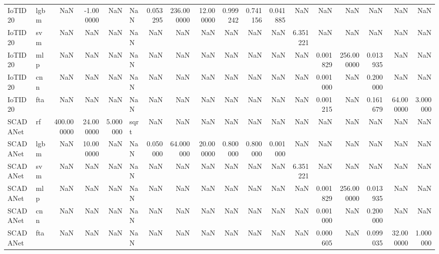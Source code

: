 \begin{tabular}{llrrrlrrrrrrrrrrrr}
IoTID20 & lgbm & NaN & -1.000000 & NaN & NaN & 0.053295 & 236.000000 & 12.000000 & 0.999242 & 0.741156 & 0.041885 & NaN & NaN & NaN & NaN & NaN & NaN \\
IoTID20 & svm & NaN & NaN & NaN & NaN & NaN & NaN & NaN & NaN & NaN & NaN & 6.351221 & NaN & NaN & NaN & NaN & NaN \\
IoTID20 & mlp & NaN & NaN & NaN & NaN & NaN & NaN & NaN & NaN & NaN & NaN & NaN & 0.001829 & 256.000000 & 0.013935 & NaN & NaN \\
IoTID20 & cnn & NaN & NaN & NaN & NaN & NaN & NaN & NaN & NaN & NaN & NaN & NaN & 0.001000 & NaN & 0.200000 & NaN & NaN \\
IoTID20 & fta & NaN & NaN & NaN & NaN & NaN & NaN & NaN & NaN & NaN & NaN & NaN & 0.001215 & NaN & 0.161679 & 64.000000 & 3.000000 \\
SCADANet & rf & 400.000000 & 24.000000 & 5.000000 & sqrt & NaN & NaN & NaN & NaN & NaN & NaN & NaN & NaN & NaN & NaN & NaN & NaN \\
SCADANet & lgbm & NaN & 10.000000 & NaN & NaN & 0.050000 & 64.000000 & 20.000000 & 0.800000 & 0.800000 & 0.001000 & NaN & NaN & NaN & NaN & NaN & NaN \\
SCADANet & svm & NaN & NaN & NaN & NaN & NaN & NaN & NaN & NaN & NaN & NaN & 6.351221 & NaN & NaN & NaN & NaN & NaN \\
SCADANet & mlp & NaN & NaN & NaN & NaN & NaN & NaN & NaN & NaN & NaN & NaN & NaN & 0.001829 & 256.000000 & 0.013935 & NaN & NaN \\
SCADANet & cnn & NaN & NaN & NaN & NaN & NaN & NaN & NaN & NaN & NaN & NaN & NaN & 0.001000 & NaN & 0.200000 & NaN & NaN \\
SCADANet & fta & NaN & NaN & NaN & NaN & NaN & NaN & NaN & NaN & NaN & NaN & NaN & 0.000605 & NaN & 0.099035 & 32.000000 & 1.000000 \\
\bottomrule
\end{tabular}
